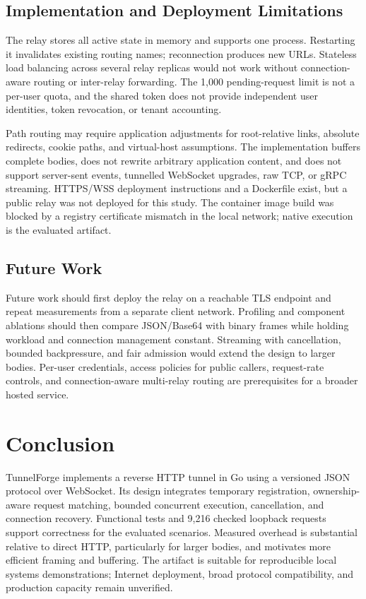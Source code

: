 \documentclass[conference]{IEEEtran}
\begin{document}
\subsection{Implementation and Deployment Limitations}

The relay stores all active state in memory and supports one process. Restarting it invalidates existing routing names; reconnection produces new URLs. Stateless load balancing across several relay replicas would not work without connection-aware routing or inter-relay forwarding. The 1,000 pending-request limit is not a per-user quota, and the shared token does not provide independent user identities, token revocation, or tenant accounting.

Path routing may require application adjustments for root-relative links, absolute redirects, cookie paths, and virtual-host assumptions. The implementation buffers complete bodies, does not rewrite arbitrary application content, and does not support server-sent events, tunnelled WebSocket upgrades, raw TCP, or gRPC streaming. HTTPS/WSS deployment instructions and a Dockerfile exist, but a public relay was not deployed for this study. The container image build was blocked by a registry certificate mismatch in the local network; native execution is the evaluated artifact.

\subsection{Future Work}

Future work should first deploy the relay on a reachable TLS endpoint and repeat measurements from a separate client network. Profiling and component ablations should then compare JSON/Base64 with binary frames while holding workload and connection management constant. Streaming with cancellation, bounded backpressure, and fair admission would extend the design to larger bodies. Per-user credentials, access policies for public callers, request-rate controls, and connection-aware multi-relay routing are prerequisites for a broader hosted service.

\section{Conclusion}

TunnelForge implements a reverse HTTP tunnel in Go using a versioned JSON protocol over WebSocket. Its design integrates temporary registration, ownership-aware request matching, bounded concurrent execution, cancellation, and connection recovery. Functional tests and 9,216 checked loopback requests support correctness for the evaluated scenarios. Measured overhead is substantial relative to direct HTTP, particularly for larger bodies, and motivates more efficient framing and buffering. The artifact is suitable for reproducible local systems demonstrations; Internet deployment, broad protocol compatibility, and production capacity remain unverified.
\end{document}
